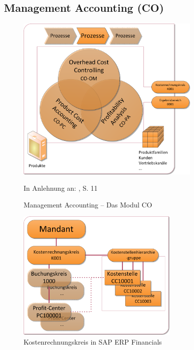 \subsection{Management Accounting (CO)} %
\begin{figure}[htbp]
\begin{center}
\includegraphics[width=0.8\textwidth]{Images/managementAccounting.png}

   {\footnotesize In Anlehnung an: \cite{SAPCOOMABC2001}, S. 11}
   \caption[Management Accounting -- Das Modul CO]{Management Accounting -- Das Modul CO}\label{abb3}
\end{center}
\end{figure}\noindent
\begin{figure}[htbpr] 
\begin{center}
\includegraphics[width=0.7\textwidth]{Images/kostenRechnungskreis.png}
   \caption[Kostenrechnungskreis in SAP ERP Financials]{Kostenrechnungskreis in SAP ERP Financials}\label{abb4}
\end{center}
\end{figure}\noindent

